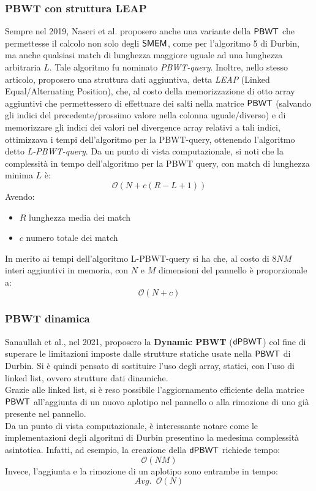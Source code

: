 \subsubsection{PBWT con struttura LEAP}
Sempre nel 2019, Naseri et al.\cite{leap} proposero anche una variante della
$\mbox{\rm {\sf PBWT}}$ 
che permettesse il calcolo non solo degli $\mbox{\rm {\sf SMEM}}$, come per l'algoritmo 5
di Durbin, ma anche qualsiasi match di lunghezza maggiore uguale ad una
lunghezza arbitraria $L$. Tale algoritmo fu nominato
\textit{PBWT-query}. Inoltre, nello 
stesso articolo, proposero 
una struttura dati aggiuntiva, detta \textit{LEAP} (Linked
Equal/Alternating Position), che, al costo della 
memorizzazione di otto array aggiuntivi che permettessero di effettuare dei
salti nella matrice $\mbox{\rm {\sf PBWT}}$ (salvando gli indici del precedente/prossimo
valore nella colonna uguale/diverso) e di memorizzare gli indici dei valori
nel divergence array relativi a tali indici, ottimizzava i tempi
dell'algoritmo per la PBWT-query, ottenendo l'algoritmo detto
\textit{L-PBWT-query}.
Da un punto di vista computazionale, si noti che la complessità in tempo
dell'algoritmo 
per la PBWT query, con match di lunghezza minima $L$ è:
\begin{equation}
  \label{eq:leap1}
  \mathcal{O}(N+c(R-L+1))
\end{equation}
Avendo:
\begin{itemize}
  \item $R$ lunghezza media dei match
  \item $c$ numero totale dei match
\end{itemize}
In merito ai tempi dell'algoritmo L-PBWT-query si ha che, al
costo di $8NM$ interi aggiuntivi in memoria, con $N$ e $M$ dimensioni del
pannello è proporzionale a: 
\begin{equation}
  \label{eq:leap2}
  \mathcal{O}(N+c)
\end{equation}
\subsubsection{PBWT dinamica}
Sanaullah et al., nel 2021, proposero la \textbf{Dynamic PBWT} ($\mbox{\rm {\sf dPBWT}}$)
\cite{dpbwt} col fine di superare le limitazioni imposte dalle strutture
statiche usate nella $\mbox{\rm {\sf PBWT}}$ di Durbin. Si è quindi pensato di sostituire
l'uso degli array, statici, con l'uso di linked list, ovvero strutture dati
dinamiche.\\ 
Grazie alle linked list, si è reso possibile l'aggiornamento
efficiente della matrice $\mbox{\rm {\sf PBWT}}$ all'aggiunta di un nuovo aplotipo nel
pannello o alla rimozione di uno già presente nel pannello.\\
Da un punto di vista computazionale, è interessante notare come le
implementazioni degli algoritmi di Durbin presentino la medesima complessità
asintotica. Infatti, ad esempio, la creazione della $\mbox{\rm {\sf dPBWT}}$ richiede
tempo:
\begin{equation}
  \label{eq:dpbwt}
  \mathcal{O}(NM)
\end{equation}
Invece, l'aggiunta e la rimozione di un aplotipo sono entrambe in tempo:
\begin{equation}
  \label{eq:dpbwt1}
  Avg.\,\,\,\mathcal{O}(N)
\end{equation}
